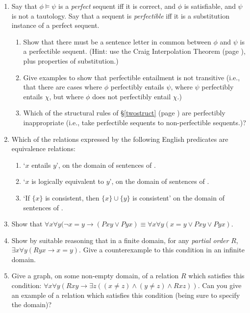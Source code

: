 {\begin{enumerate}
\item Say that $\phi \vDash \psi$ is a \emph{perfect} sequent iff it is correct, and $\phi$ is satisfiable, and	$\psi$ is not a tautology. Say that a sequent is \emph{perfectible} iff it is a substitution instance of a perfect sequent. \begin{enumerate}
	\item Show that there must be a sentence letter in common between $\phi$ and $\psi$ is a perfectible sequent. (Hint: use the Craig Interpolation Theorem (page \pageref{thmcraig}), plus properties of substitution.)
	\item Give examples to show that perfectible entailment is not transitive (i.e., that there are cases where $\phi$ perfectibly entails $\psi$, where $\psi$ perfectibly entails $\chi$, but where $\phi$ does not perfectibly entail $\chi$.)
	\item Which of the structural rules of \S\ref{twostruct} (page \pageref{twostruct}) are perfectibly inappropriate (i.e., take perfectible sequents to non-perfectible sequents.)?
\end{enumerate}
	
	
\item Which of the relations expressed by the following English predicates are equivalence relations: \begin{enumerate}
	\item `$x$ entails $y$', on the domain of sentences of \ltwo.
	\item `$x$ is logically equivalent to $y$', on the domain of sentences of \ltwo.
	\item `If $\{x\}$ is consistent, then $\{x\}\cup \{y\}$ is consistent' on the domain of sentences of \ltwo.
\end{enumerate}

\item  Show that $\forall x \forall y (\neg x=y\to (Pxy \vee Pyx) \equiv \forall x \forall y (x=y \vee Pxy \vee Pyx)$. 
	
\item Show by suitable reasoning that
    in a finite domain, for any \emph{partial order} $R$,  $\exists x \forall y (Ryx \to
    x=y)$. Give a counterexample to this condition in an infinite domain. 

\item Give a graph, on some non-empty domain, of a relation $R$
	which satisfies this condition:
	$\forall x \forall y (Rxy \to \exists z ((x \neq z) \wedge (y \neq
	z) \wedge Rxz))$. Can you give an example of a relation which
	satisfies this condition (being sure to specify the domain)?
	

\end{enumerate}}
